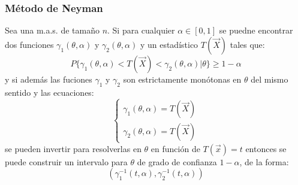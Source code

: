 
\subsubsection{Método de Neyman}
\begin{teorema}
    Sea una m.a.s. de tamaño $n$. Si para cualquier $\alpha \in [0,1]$ se puedne encontrar dos funciones $\gamma_1(\theta, \alpha)$ y $\gamma_2(\theta, \alpha)$ y un estadístico $T(\vec{X})$ tales que: 
    $$P\{\gamma_1(\theta, \alpha) < T(\vec{X}) < \gamma_2(\theta, \alpha) | \theta\} \geq 1 - \alpha$$
    y si además las fuciones $\gamma_1$ y $\gamma_2$ son estrictamente monótonas en $\theta$ del mismo sentido y las ecuaciones: 
    $$\begin{cases}
        \gamma_1(\theta, \alpha) = T(\vec{X}) \\
        \gamma_2(\theta, \alpha) = T(\vec{X})
    \end{cases}$$
    se pueden invertir para resolverlas en $\theta$ en función de $T(\vec{x}) = t$ entonces se puede construir un intervalo para $\theta$ de grado de confianza $1 - \alpha$, de la forma: 
    $$\left(\gamma_1^{-1}(t, \alpha), \gamma_2^{-1}(t, \alpha)\right)$$
\end{teorema}

